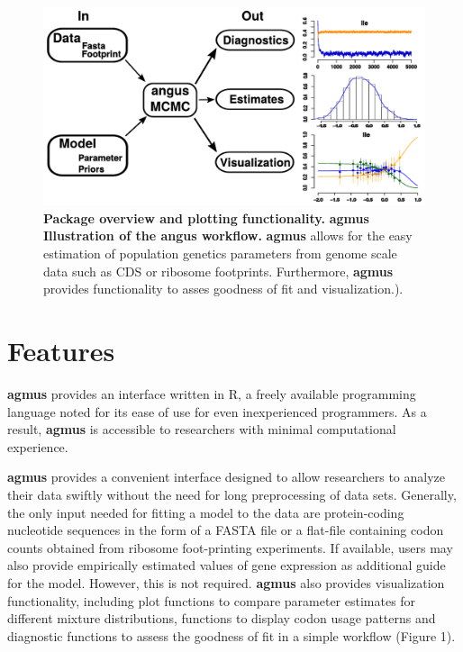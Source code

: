 \documentclass{bioinfo}
\newcommand{\package}{\textbf{agmus }} %
\begin{document}
\begin{figure}[!tpb]
\centering
 \includegraphics[width=5in]{workflow_croped.pdf}
\vspace{-0.2cm}
\caption{\textbf{Package overview and plotting functionality.} \package \textbf{Illustration of the angus workflow.} 
\package allows for the easy estimation of population genetics parameters from genome scale data such as CDS or ribosome footprints. 
Furthermore, \package provides functionality to asses goodness of fit and visualization.). 
}
\label{fig:plotbin}
\end{figure}

\section*{Features}
\package provides an interface written in R, a freely available programming language noted for its ease of use for even inexperienced programmers. 
As a result, \package is accessible to researchers with minimal computational experience. 

\package provides a convenient interface designed to allow researchers to analyze their data swiftly without the need for long preprocessing of data sets. 
Generally, the only input needed for fitting a model to the data are protein-coding nucleotide sequences in the form of a FASTA file or a flat-file containing codon counts obtained from ribosome foot-printing experiments. 
If available, users may also provide empirically estimated values of gene expression as additional guide for the model. However, this is not required.
\package also provides visualization functionality, including plot functions to compare parameter estimates for different mixture distributions, functions to display codon usage patterns and diagnostic functions to assess the goodness of fit in a simple workflow (Figure 1).
\end{document}
